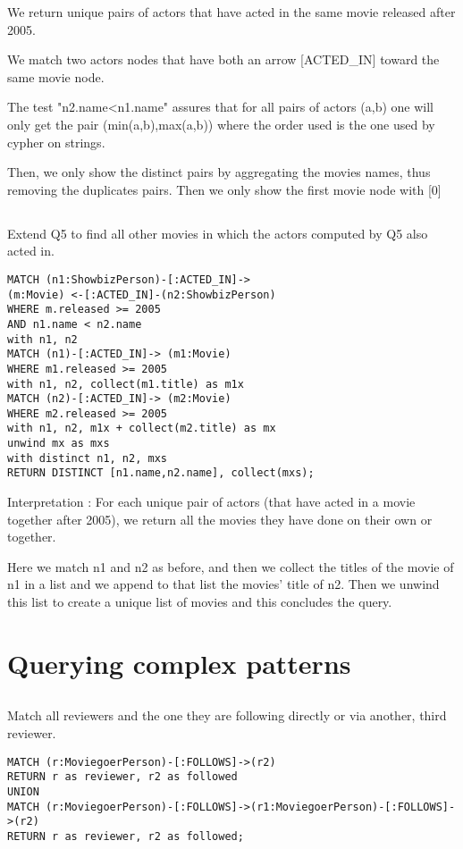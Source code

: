 We return unique pairs of actors that have acted in the same movie released after 2005.

We match two actors nodes that have both an arrow [ACTED\_IN] toward the same movie node.

The test "n2.name<n1.name" assures that for all pairs of actors (a,b) one will only get the pair (min(a,b),max(a,b)) where the order used is the one used by cypher on strings.

Then, we only show the distinct pairs by aggregating the movies names, thus removing the duplicates pairs. Then we only show the first movie node with [0]

\subsection{}
Extend Q5 to find all other movies in which the actors computed by Q5 also acted in.

\begin{verbatim}
MATCH (n1:ShowbizPerson)-[:ACTED_IN]->
(m:Movie) <-[:ACTED_IN]-(n2:ShowbizPerson)
WHERE m.released >= 2005
AND n1.name < n2.name
with n1, n2
MATCH (n1)-[:ACTED_IN]-> (m1:Movie)
WHERE m1.released >= 2005
with n1, n2, collect(m1.title) as m1x
MATCH (n2)-[:ACTED_IN]-> (m2:Movie)
WHERE m2.released >= 2005
with n1, n2, m1x + collect(m2.title) as mx
unwind mx as mxs
with distinct n1, n2, mxs
RETURN DISTINCT [n1.name,n2.name], collect(mxs);
\end{verbatim}

Interpretation : For each unique pair of actors (that have acted in a movie together after 2005), we return all the movies they have done on their own or together.

Here we match n1 and n2 as before, and then we collect the titles of the movie of n1 in a list and we append to that list the movies' title of n2. Then we unwind this list to create a unique list of movies and this concludes the query.

\section{Querying complex patterns}
\subsection{}
Match all reviewers and the one they are following directly or via another, third reviewer.

\begin{verbatim}
MATCH (r:MoviegoerPerson)-[:FOLLOWS]->(r2)
RETURN r as reviewer, r2 as followed
UNION
MATCH (r:MoviegoerPerson)-[:FOLLOWS]->(r1:MoviegoerPerson)-[:FOLLOWS]->(r2)
RETURN r as reviewer, r2 as followed;
\end{verbatim}

